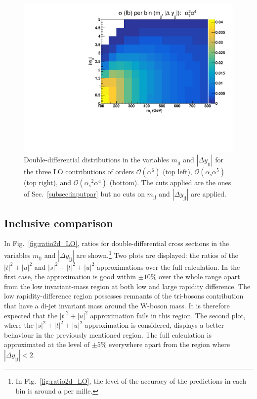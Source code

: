 \documentclass[twocolumn,epjc3]{svjour3} %
\newcommand{\Pj}{\ensuremath{\text{j}}\xspace}
\newcommand{\PW}{\ensuremath{\text{W}}\xspace}
\newcommand{\alphas}{\ensuremath{\alpha_\text{s}}\xspace}
\begin{document}
\begin{figure}
    \includegraphics[scale=0.395]{figures/scanfigures/scan_ew4qcd2.pdf}
    \caption{Double-differential distributions in the variables $m_{\Pj\Pj}$ and $|\Delta y_{\Pj\Pj}|$ for the three LO contributions of orders $\mathcal{O}(\alpha^6)$ (top left), $\mathcal{O}(\alphas\alpha^5)$ (top right), and $\mathcal{O}(\alphas^2 \alpha^4)$ (bottom).
    The cuts applied are the ones of Sec.~\protect\ref{subsec:inputpar} but no cuts on $m_{\Pj\Pj}$ and $|\Delta y_{\Pj\Pj}|$ are applied.
    }
    \label{fig:mjjdyjj_2d_LO}
    \end{figure}
    \subsection{Inclusive comparison}
        \label{subsec:LOinclusive}
    In Fig.~\ref{fig:ratio2d_LO}, ratios for double-differential cross sections in the variables  $m_{\Pj\Pj}$ and $|\Delta y_{\Pj\Pj}|$ are shown.\footnote{In Fig.~\ref{fig:ratio2d_LO}, the level of the accuracy of the predictions in each bin is around a per mille.}
    Two plots are displayed: the ratios of the $|t|^2 + |u|^2$ and $|s|^2 + |t|^2 + |u|^2$ approximations over the full calculation.
    In the first case, the approximation is good within $\pm10\%$ over the whole range apart from the low invariant-mass region at both low and large rapidity difference.
    The low rapidity-difference region possesses remnants of the tri-bosons contribution that have a di-jet invariant mass around the $\PW$-boson mass.
    It is therefore expected that the $|t|^2 + |u|^2$ approximation fails in this region.
    The second plot, where the $|s|^2 + |t|^2 + |u|^2$ approximation is considered, displays a better behaviour in the previously mentioned region.
    The full calculation is approximated at the level of $\pm5\%$ everywhere apart from the region where $|\Delta y_{\Pj\Pj}| < 2$.
\end{document}
